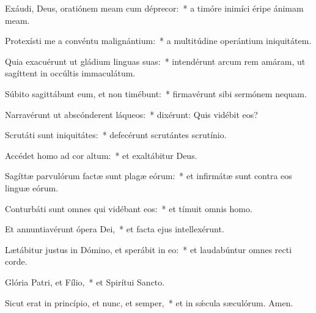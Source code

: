 \item Exáudi, Deus, oratiónem meam cum déprecor:~* a timóre inimíci éripe ánimam meam.

\item Protexísti me a convéntu malignántium:~* a multitúdine operántium iniquitátem.

\item Quia exacuérunt ut gládium linguas suas:~* intendérunt arcum rem amáram, ut sagíttent in occúltis immaculátum.

\item Súbito sagittábunt eum, et non timébunt:~* firmavérunt sibi sermónem nequam.

\item Narravérunt ut abscónderent láqueos:~* dixérunt: Quis vidébit eos?

\item Scrutáti sunt iniquitátes:~* defecérunt scrutántes scrutínio.

\item Accédet homo ad cor altum:~* et exaltábitur Deus.

\item Sagíttæ parvulórum factæ sunt plagæ eórum:~* et infirmátæ sunt contra eos linguæ eórum.

\item Conturbáti sunt omnes qui vidébant eos:~* et tímuit omnis homo.

\item Et annuntiavérunt ópera Dei,~* et facta ejus intellexérunt.

\item Lætábitur justus in Dómino, et sperábit in eo:~* et laudabúntur omnes recti corde.

\item Glória Patri, et Fílio,~* et Spirítui Sancto.

\item Sicut erat in princípio, et nunc, et semper,~* et in sǽcula sæculórum. Amen.

